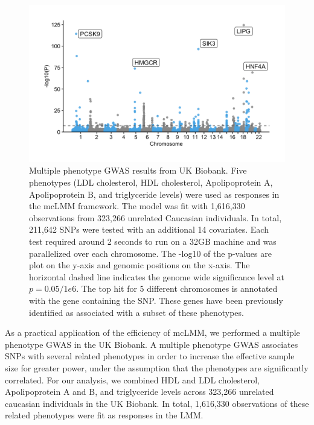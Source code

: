         \begin{figure}
            \centering
            \includegraphics[width=\textwidth]{chapter3/figures/Figure_6.png}
            \caption{Multiple phenotype GWAS results from UK Biobank. Five phenotypes (LDL cholesterol, HDL cholesterol, Apolipoprotein A, Apolipoprotein B, and triglyceride levels) were used as responses in the mcLMM framework. The model was fit with 1,616,330 observations from 323,266 unrelated Caucasian individuals. In total, 211,642 SNPs were tested with an additional 14 covariates. Each test required around 2 seconds to run on a 32GB machine and was parallelized over each chromosome. The -log10 of the p-values are plot on the y-axis and genomic positions on the x-axis. The horizontal dashed line indicates the genome wide significance level at $p=0.05/1e6$. The top hit for 5 different chromosomes is annotated with the gene containing the SNP. These genes have been previously identified as associated with a subset of these phenotypes.}
            \label{fig:fig6}
        \end{figure}
        
        As a practical application of the efficiency of mcLMM, we performed a multiple phenotype GWAS in the UK Biobank. A multiple phenotype GWAS associates SNPs with several related phenotypes in order to increase the effective sample size for greater power, under the assumption that the phenotypes are significantly correlated. For our analysis, we combined HDL and LDL cholesterol, Apolipoprotein A and B, and triglyceride levels across 323,266 unrelated caucasian individuals in the UK Biobank. In total, 1,616,330 observations of these related phenotypes were fit as responses in the LMM. 
        
